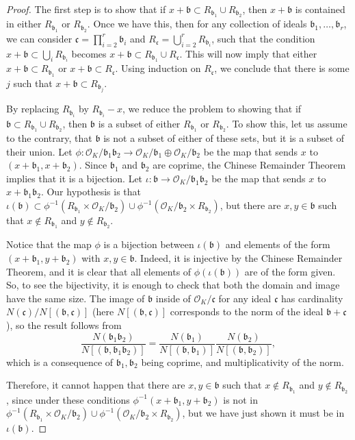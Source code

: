 \documentclass[a4paper,11pt,reqno]{amsart}
\theoremstyle{plain}
\theoremstyle{remark}
\newcommand{\co}{\mathcal{O}}
\newcommand{\gb}{\mathfrak{b}}
\newcommand{\gc}{\mathfrak{c}}
\begin{document}
		\begin{proof}
			
			The first step is to show that if $x + \gb \subset R_{\gb_1} \cup R_{\gb_2}$, then $x + \gb$ is contained in either $R_{\gb_1}$ or $R_{\gb_2}$. Once we have this, then for any collection of ideals $\gb_1, \dots, \gb_r$, we can consider $\gc = \prod_{i=2}^r \gb_i$ and $R_\gc = \bigcup_{i=2}^r R_{\gb_i}$, such that the condition $x + \gb \subset \bigcup_{i} R_{\gb_i}$ becomes $x + \gb \subset R_{\gb_1} \cup R_{\gc}$. This will now imply that either $x + \gb \subset R_{\gb_1}$ or $x + \gb \subset R_{\gc}$. Using induction on $R_\gc$, we conclude that there is some $j$ such that $x + \gb \subset R_{\gb_j}$.
			
			By replacing $R_{\gb_i}$ by $R_{\gb_i}-x$, we reduce the problem to showing that if $\gb \subset R_{\gb_1} \cup R_{\gb_2}$, then $\gb$ is a subset of either $R_{\gb_1}$ or $R_{\gb_2}$. To show this, let us assume to the contrary, that $\gb$ is not a subset of either of these sets, but it is a subset of their union. Let $\phi: \co_K/\gb_1\gb_2 \rightarrow \co_K/\gb_1 \oplus\co_K/\gb_2 $ be the map that sends $x$ to $(x + \gb_1, x + \gb_2)$. Since $\gb_1$ and $\gb_2$ are coprime, the Chinese Remainder Theorem implies that it is a bijection. Let $\iota: \gb \rightarrow \co_K/\gb_1\gb_2$ be the map that sends $x$ to $x+\gb_1\gb_2$. Our hypothesis is that $\iota(\gb) \subset \phi^{-1}(R_{\gb_1}\times \co_K/\gb_2)\cup \phi^{-1}(\co_K/\gb_2 \times R_{\gb_2})$, but there are $x,y\in \gb$ such that $x \not \in R_{\gb_1}$ and $y \not \in R_{\gb_2}$. 
			
			Notice that the map $\phi$ is a bijection between $\iota(\gb)$ and elements of the form $(x+\gb_1,y+\gb_2)$ with $x,y \in \gb$. Indeed, it is injective by the Chinese Remainder Theorem, and it is clear that all elements of $\phi(\iota(\gb))$ are of the form given. So, to see the bijectivity, it is enough to check that both the domain and image have the same size. The image of $\gb$ inside of $\co_K/\gc$ for any ideal $\gc$ has cardinality $N(\gc)/N\left[(\gb,\gc)\right]$ (here $N\left[(\gb,\gc)\right]$ corresponds to the norm of the ideal $\gb+ \gc$), so the result follows from $$\frac{N(\gb_1\gb_2)}{N\left[(\gb,\gb_1\gb_2)\right]} = \frac{ N(\gb_1)}{N\left[(\gb,\gb_1)\right]} \frac{N(\gb_2)}{N\left[(\gb,\gb_2)\right]},$$ which is a consequence of $\gb_1, \gb_2$ being coprime, and multiplicativity of the norm. 
			
			Therefore, it cannot happen that there are $x,y\in \gb$ such that $x \not \in R_{\gb_1}$ and $y \not \in R_{\gb_2}$, since under these conditions $\phi^{-1}(x + \gb_1,y + \gb_2 )$ is not in $\phi^{-1}(R_{\gb_1}\times \co_K/\gb_2)\cup \phi^{-1}(\co_K/\gb_2 \times R_{\gb_2})$, but we have just shown it must be in $\iota(\gb)$.
		\end{proof}
		
\end{document}
